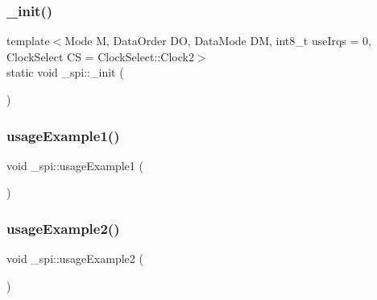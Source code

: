 \hypertarget{namespace__spi_a9d124f8fde004a9e441e849e2555bd31}{}\label{namespace__spi_a9d124f8fde004a9e441e849e2555bd31} 
\subsubsection{\texorpdfstring{\+\_\+init()}{\_init()}\hspace{0.1cm}{\footnotesize\ttfamily [2/2]}}
{\footnotesize\ttfamily template$<$Mode M, Data\+Order DO, Data\+Mode DM, int8\+\_\+t use\+Irqs = 0, Clock\+Select CS = Clock\+Select\+::\+Clock2$>$ \\
static void \+\_\+spi\+::\+\_\+init (\begin{DoxyParamCaption}{ }\end{DoxyParamCaption})\hspace{0.3cm}{\ttfamily [static]}}

\hypertarget{namespace__spi_aa9590ef47ecdda8d22a2f094065b799f}{}\label{namespace__spi_aa9590ef47ecdda8d22a2f094065b799f} 
\subsubsection{\texorpdfstring{usage\+Example1()}{usageExample1()}}
{\footnotesize\ttfamily void \+\_\+spi\+::usage\+Example1 (\begin{DoxyParamCaption}{ }\end{DoxyParamCaption})}

\hypertarget{namespace__spi_abce92b4ae6ee23a31f8f43454c1e1f0e}{}\label{namespace__spi_abce92b4ae6ee23a31f8f43454c1e1f0e} 
\subsubsection{\texorpdfstring{usage\+Example2()}{usageExample2()}}
{\footnotesize\ttfamily void \+\_\+spi\+::usage\+Example2 (\begin{DoxyParamCaption}{ }\end{DoxyParamCaption})}

